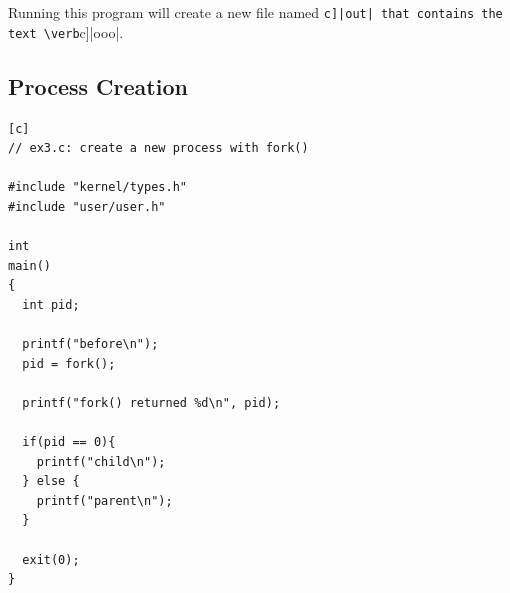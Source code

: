 Running this program will create a new file named
\verb[c]|out| that contains the text \verb[c]|ooo|.


\subsection{Process Creation}

\begin{verbatim}[c]
// ex3.c: create a new process with fork()

#include "kernel/types.h"
#include "user/user.h"

int
main()
{
  int pid;

  printf("before\n");
  pid = fork();

  printf("fork() returned %d\n", pid);

  if(pid == 0){
    printf("child\n");
  } else {
    printf("parent\n");
  }
  
  exit(0);
}
\end{verbatim}

